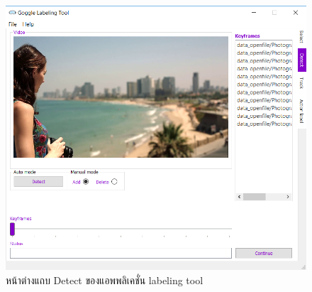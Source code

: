 \begin{figure}[!ht]
    \centering
    \includegraphics[width=1\textwidth]{chapter3/images/3_3/detect.png}
    \caption{หน้าต่างแถบ Detect ของแอพพลิเคชั่น labeling tool}
    \label{fig:detectTab}
\end{figure}

